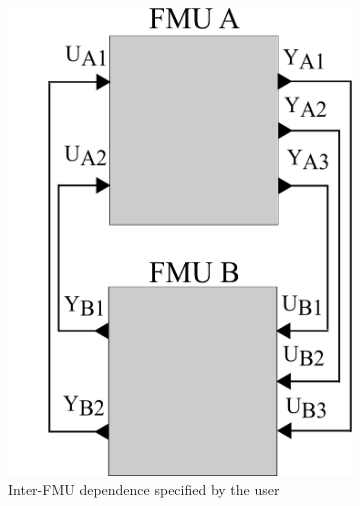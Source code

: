 \begin{figure}[htb]
\centering
\begin{subfigure}{.5\textwidth}
  \centering
  \includegraphics[scale=0.2]{figures/Two_Models_Black_Box}
  \caption{Inter-FMU dependence specified by the user}
  \label{fig:2mdlsbb}
\end{subfigure}%
\begin{subfigure}{.5\textwidth}
  \centering

\end{subfigure}
\end{figure}
